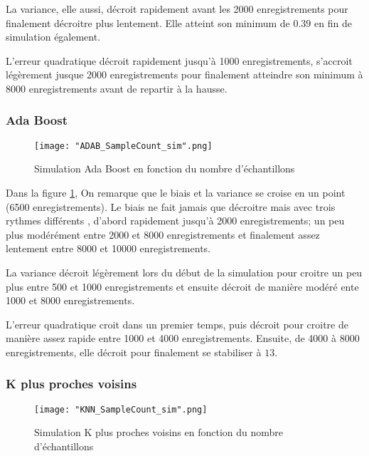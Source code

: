 \documentclass[a4paper]{article}
\begin{document}
La variance, elle aussi, décroit rapidement avant les 2000 enregistrements pour finalement décroitre plus lentement. Elle atteint son minimum de $0.39$ en fin de simulation également. \newline

L'erreur quadratique décroit rapidement jusqu'à 1000 enregistrements, s'accroit légèrement jusque 2000 enregistrements pour finalement atteindre son minimum à 8000 enregistrements avant de repartir à la hausse.

\newpage

\subsubsection{Ada Boost}

\begin{figure}[!h]
	\centering
	\texttt{[image: "ADAB\_SampleCount\_sim".png]}
	\caption{Simulation Ada Boost en fonction du nombre d'échantillons}
	\label{ADAB_SampleCount}
\end{figure}

Dans la figure \ref{ADAB_SampleCount}, On remarque que le biais et la variance se croise en un point (6500 enregistrements). Le biais ne fait jamais que décroitre mais avec trois rythmes différents , d'abord rapidement jusqu'à 2000 enregistrements; un peu plus modérément entre 2000 et 8000 enregistrements et finalement assez lentement entre 8000 et 10000 enregistrements. \newline

La variance décroit légèrement lors du début de la simulation pour croitre un peu plus entre 500 et 1000 enregistrements et ensuite décroit de manière modéré ente 1000 et 8000 enregistrements. \newline

L'erreur quadratique croit dans un premier temps, puis décroit pour croitre de manière assez rapide entre 1000 et 4000 enregistrements. Ensuite, de 4000 à 8000 enregistrements, elle décroit pour finalement se stabiliser à $13$.

\newpage

\subsubsection{K plus proches voisins}

\begin{figure}[!h]
	\centering
	\texttt{[image: "KNN\_SampleCount\_sim".png]}
	\caption{Simulation K plus proches voisins en fonction du nombre d'échantillons}
	\label{KNN_SampleCount}
\end{figure}
\end{document}
